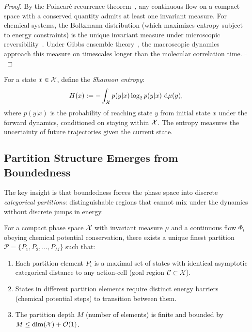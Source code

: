 \begin{proof}
By the Poincaré recurrence theorem~\cite{Walters1982,Birkhoff1931}, any continuous flow on a compact space with a conserved quantity admits at least one invariant measure. For chemical systems, the Boltzmann distribution (which maximizes entropy subject to energy constraints) is the unique invariant measure under microscopic reversibility~\cite{EvansSearching2002,JarzynskiNonequilibrium1997}. Under Gibbs ensemble theory~\cite{Jaynes1957}, the macroscopic dynamics approach this measure on timescales longer than the molecular correlation time. $\square$
\end{proof}

\begin{definition}
\label{def:state-entropy}
For a state $x \in \mathcal{X}$, define the \emph{Shannon entropy}:
\begin{equation}
  H(x) := -\int_{\mathcal{X}} p(y|x) \log_2 p(y|x) \, \,\mathrm{d}\mu(y),
\end{equation}
where $p(y|x)$ is the probability of reaching state $y$ from initial state $x$ under the forward dynamics, conditioned on staying within $\mathcal{X}$. The entropy measures the uncertainty of future trajectories given the current state.
\end{definition}

\subsection{Partition Structure Emerges from Boundedness}
\label{subsec:partition-structure}

The key insight is that boundedness forces the phase space into discrete \emph{categorical partitions}: distinguishable regions that cannot mix under the dynamics without discrete jumps in energy.

\begin{theorem}
\label{thm:partition-structure}
For a compact phase space $\mathcal{X}$ with invariant measure $\mu$ and a continuous flow $\Phi_t$ obeying chemical potential conservation, there exists a unique finest partition $\mathcal{P} = \{P_1, P_2, \ldots, P_M\}$ such that:
\begin{enumerate}[label=(\roman*), noitemsep]
\item Each partition element $P_i$ is a maximal set of states with identical asymptotic categorical distance to any action-cell (goal region $\mathcal{C} \subset \mathcal{X}$).
\item States in different partition elements require distinct energy barriers (chemical potential steps) to transition between them.
\item The partition depth $M$ (number of elements) is finite and bounded by $M \leq \dim(\mathcal{X}) + \mathcal{O}(1)$.
\end{enumerate}
\end{theorem}

